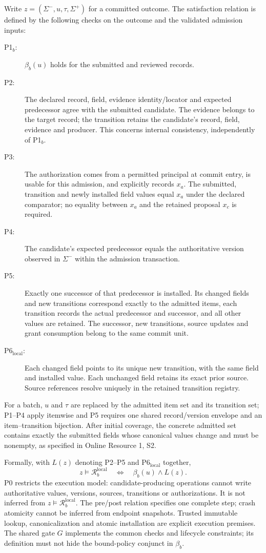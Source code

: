 Write $z=(\Sigma^-,u,\tau,\Sigma^+)$ for a committed outcome. The satisfaction
relation is defined by the following checks on the outcome and the validated
admission inputs:
\begin{description}
\item[P1$_b$:] $\beta_b(u)$ holds for the submitted and reviewed records.
\item[P2:] The declared record, field, evidence identity/locator and expected
predecessor agree with the submitted candidate. The evidence belongs to the
target record; the transition retains the candidate's record, field, evidence
and producer. This concerns internal consistency, independently of P1$_b$.
\item[P3:] The authorization comes from a permitted principal at commit entry,
is usable for this admission, and explicitly records $x_a$. The submitted,
transition and newly installed field values equal $x_a$ under the declared
comparator; no equality between $x_a$ and the retained proposal $x_c$ is required.
\item[P4:] The candidate's expected predecessor equals the authoritative
version observed in $\Sigma^-$ within the admission transaction.
\item[P5:] Exactly one successor of that predecessor is installed. Its changed
fields and new transitions correspond exactly to the admitted items, each
transition records the actual predecessor and successor, and all other values
are retained. The successor, new transitions, source updates and grant
consumption belong to the same commit unit.
\item[P6$_{\mathrm{local}}$:] Each changed field points to its unique new
transition, with the same field and installed value. Each unchanged field
retains its exact prior source. Source references resolve uniquely in the
retained transition registry.
\end{description}
For a batch, $u$ and $\tau$ are replaced by the admitted item set and its
transition set; P1--P4 apply itemwise and P5 requires one shared record/version
envelope and an item--transition bijection. After initial coverage, the concrete
admitted set contains exactly the submitted fields whose canonical values
change and must be nonempty, as specified in Online Resource 1, S2.

Formally, with $L(z)$ denoting P2--P5 and P6$_{\mathrm{local}}$ together,
\[
 z\models\mathcal R_b^{\mathrm{local}}
 \quad\Longleftrightarrow\quad \beta_b(u)\land L(z).
\]
P0 restricts the execution model: candidate-producing operations cannot write
authoritative values, versions, sources, transitions or authorizations. It is
not inferred from $z\models\mathcal R_b^{\mathrm{local}}$. The pre/post relation
specifies one complete step; crash atomicity cannot be inferred from endpoint
snapshots. Trusted immutable lookup, canonicalization and atomic installation
are explicit execution premises. The shared gate
$G$ implements the common checks and lifecycle constraints; its definition
must not hide the bound-policy conjunct in $\beta_b$.

